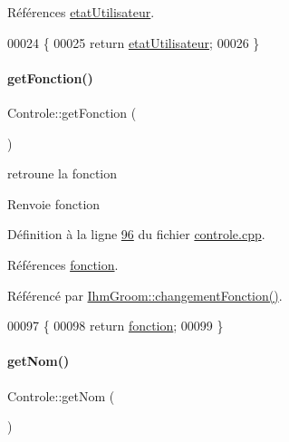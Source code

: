 Références \hyperlink{controle_8h_source_l00069}{etat\+Utilisateur}.


\begin{DoxyCode}
00024 \{
00025     \textcolor{keywordflow}{return} \hyperlink{class_controle_a690595803de8f5c172b8bc46122ebb1a}{etatUtilisateur};
00026 \}
\end{DoxyCode}
\mbox{\label{class_controle_a8d2891b2b01c503d10f775b4b14a3777}} 
\paragraph{\texorpdfstring{get\+Fonction()}{getFonction()}}
{\footnotesize\ttfamily Controle\+::get\+Fonction (\begin{DoxyParamCaption}{ }\end{DoxyParamCaption})}



retroune la fonction 

\begin{DoxyReturn}{Renvoie}
fonction 
\end{DoxyReturn}


Définition à la ligne \hyperlink{controle_8cpp_source_l00096}{96} du fichier \hyperlink{controle_8cpp_source}{controle.\+cpp}.



Références \hyperlink{controle_8h_source_l00075}{fonction}.



Référencé par \hyperlink{ihmgroom_8cpp_source_l00075}{Ihm\+Groom\+::changement\+Fonction()}.


\begin{DoxyCode}
00097 \{
00098     \textcolor{keywordflow}{return} \hyperlink{class_controle_af733c06309ce63fb9157073574e42b00}{fonction};
00099 \}
\end{DoxyCode}
\mbox{\label{class_controle_ac6e8590a5108e97fce3ce3aa43feb881}} 
\paragraph{\texorpdfstring{get\+Nom()}{getNom()}}
{\footnotesize\ttfamily Controle\+::get\+Nom (\begin{DoxyParamCaption}{ }\end{DoxyParamCaption})}



